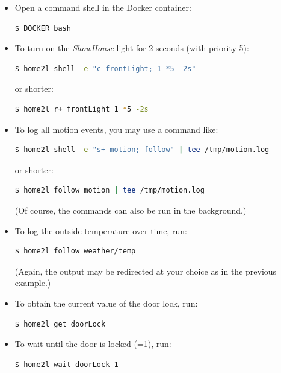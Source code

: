 \documentclass[12pt,english,parskip=half,headheight=19pt]{scrreprt}
\begin{document}
\begin{itemize}[$\blacktriangleright$]

\item
  Open a command shell in the Docker container:
  \begin{lstlisting}[language=bash]
    $ DOCKER bash
  \end{lstlisting}

\item
  To turn on the \textit{ShowHouse} light for 2 seconds (with priority 5):
  \begin{lstlisting}[language=bash]
    $ home2l shell -e "c frontLight; 1 *5 -2s"
  \end{lstlisting}
  or shorter:
  \begin{lstlisting}[language=bash]
    $ home2l r+ frontLight 1 *5 -2s
  \end{lstlisting}

\item
  To log all motion events, you may use a command like:
  \begin{lstlisting}[language=bash]
    $ home2l shell -e "s+ motion; follow" | tee /tmp/motion.log
  \end{lstlisting}
  or shorter:
  \begin{lstlisting}[language=bash]
    $ home2l follow motion | tee /tmp/motion.log
  \end{lstlisting}
  (Of course, the commands can also be run in the background.)

\item
  To log the outside temperature over time, run:
  \begin{lstlisting}[language=bash]
    $ home2l follow weather/temp
  \end{lstlisting}
  (Again, the output may be redirected at your choice as in the previous example.)

\item
  To obtain the current value of the door lock, run:
  \begin{lstlisting}[language=bash]
    $ home2l get doorLock
  \end{lstlisting}

\item
  To wait until the door is locked (=1), run:
  \begin{lstlisting}[language=bash]
    $ home2l wait doorLock 1
  \end{lstlisting}

\end{itemize}
\end{document}
